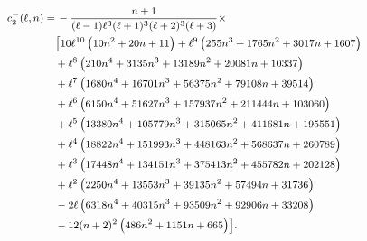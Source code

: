 \documentclass[11pt]{article}
\numberwithin{equation}{section}
\begin{document}
\begin{equation}\footnotesize
\begin{aligned}
c_2^-(\ell,n)=&\,-\frac{n+1}{(\ell-1) \ell^3 (\ell+1)^3 (\ell+2)^3 (\ell+3)}\times\\
&\bigl[10 \ell^{10} \left(10 n^2+20 n+11\right)+\ell^9 \left(255 n^3+1765 n^2+3017 n+1607\right)\\
&+\ell^8 \left(210 n^4+3135 n^3+13189 n^2+20081 n+10337\right)\\
&+\ell^7 \left(1680 n^4+16701 n^3+56375 n^2+79108 n+39514\right)\\
&+\ell^6 \left(6150 n^4+51627 n^3+157937 n^2+211444 n+103060\right)\\
&+\ell^5 \left(13380 n^4+105779 n^3+315065 n^2+411681 n+195551\right)\\
&+\ell^4 \left(18822 n^4+151993 n^3+448163 n^2+568637 n+260789\right)\\
&+\ell^3 \left(17448 n^4+134151 n^3+375413 n^2+455782 n+202128\right)\\
&+\ell^2 \left(2250 n^4+13553 n^3+39135 n^2+57494 n+31736\right)\\
&-2 \ell \left(6318 n^4+40315 n^3+93509 n^2+92906 n+33208\right)\\
&-12 (n+2)^2 \left(486 n^2+1151 n+665\right)\bigr].
\end{aligned}
\end{equation}
\end{document}

